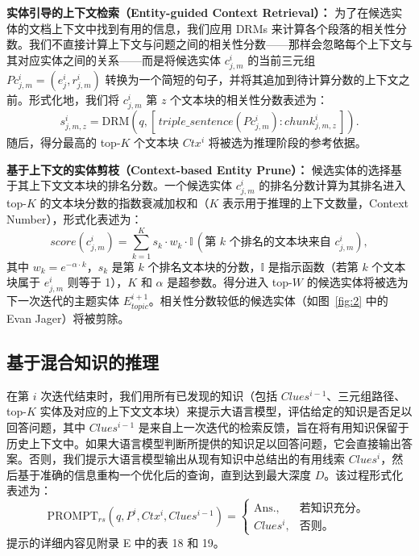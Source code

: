 \documentclass[11pt,UTF8,fontset=fandol]{ctexart}
\begin{document}
\noindent\textbf{实体引导的上下文检索（Entity-guided Context Retrieval）：} 为了在候选实体的文档上下文中找到有用的信息，我们应用 DRMs 来计算各个段落的相关性分数。我们不直接计算上下文与问题之间的相关性分数——那样会忽略每个上下文与其对应实体之间的关系——而是将候选实体 $c^{i}_{j,m}$ 的当前三元组 $Pc^{i}_{j,m}=(e^{i}_{j},r^{i}_{j,m})$ 转换为一个简短的句子，并将其追加到待计算分数的上下文之前。形式化地，我们将 $c^{i}_{j,m}$ 第 $z$ 个文本块的相关性分数表述为：
\begin{equation}
s^{i}_{j,m,z}=\mathrm{DRM}(q,[\,triple\_sentence(Pc^{i}_{j,m}):chunk^{i}_{j,m,z}\,]).
\end{equation}
随后，得分最高的 top-$K$ 个文本块 $Ctx^{i}$ 将被选为推理阶段的参考依据。

\noindent\textbf{基于上下文的实体剪枝（Context-based Entity Prune）：} 候选实体的选择基于其上下文文本块的排名分数。一个候选实体 $c^{i}_{j,m}$ 的排名分数计算为其排名进入 top-$K$ 的文本块分数的指数衰减加权和（$K$ 表示用于推理的上下文数量，Context Number），形式化表述为：
\begin{equation}
score(c^{i}_{j,m})=\sum_{k=1}^{K} s_k\cdot w_k\cdot \mathbb{I}\,(\text{第 }k\text{ 个排名的文本块来自 }c^{i}_{j,m}),
\end{equation}
其中 $w_k=e^{-\alpha\cdot k}$，$s_k$ 是第 $k$ 个排名文本块的分数，$\mathbb{I}$ 是指示函数（若第 $k$ 个文本块属于 $e^{i}_{j,m}$ 则等于 1），$K$ 和 $\alpha$ 是超参数。得分进入 top-$W$ 的候选实体将被选为下一次迭代的主题实体 $E^{i+1}_{topic}$。相关性分数较低的候选实体（如图~\ref{fig:2} 中的 Evan Jager）将被剪除。

\subsection{基于混合知识的推理}

在第 $i$ 次迭代结束时，我们用所有已发现的知识（包括 $Clues^{i-1}$、三元组路径、top-$K$ 实体及对应的上下文文本块）来提示大语言模型，评估给定的知识是否足以回答问题，其中 $Clues^{i-1}$ 是来自上一次迭代的检索反馈，旨在将有用知识保留于历史上下文中。如果大语言模型判断所提供的知识足以回答问题，它会直接输出答案。否则，我们提示大语言模型输出从现有知识中总结出的有用线索 $Clues^{i}$，然后基于准确的信息重构一个优化后的查询，直到达到最大深度 $D$。该过程形式化表述为：
\begin{equation}
\mathrm{PROMPT}_{rs}(q,P^{i},Ctx^{i},Clues^{i-1})=
\begin{cases}
\mathrm{Ans.}, & \text{若知识充分。}\\
Clues^{i}, & \text{否则。}
\end{cases}
\end{equation}
提示的详细内容见附录 E 中的表 18 和 19。
\end{document}
